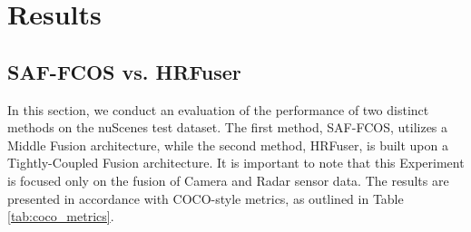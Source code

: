 \documentclass[report.tex]{subfiles}
\begin{document}
    \section{Results}

    \subsection{SAF-FCOS vs. HRFuser}

    In this section, we conduct an evaluation of the performance of two distinct methods on the nuScenes test dataset. The first method, SAF-FCOS, utilizes a Middle Fusion architecture, while the second method, HRFuser, is built upon a Tightly-Coupled Fusion architecture. It is important to note that this Experiment is focused only on the fusion of Camera and Radar sensor data. The results are presented in accordance with COCO-style metrics, as outlined in Table \ref{tab:coco_metrics}.
\end{document}
